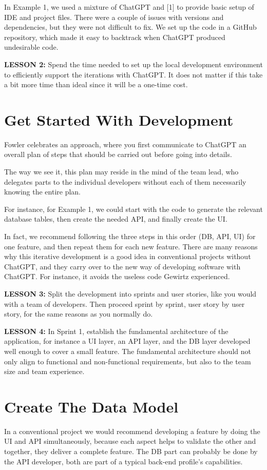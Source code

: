 \documentclass[runningheads]{llncs}
\begin{document}
In Example 1, we used a mixture of ChatGPT and [1] to provide basic setup of IDE and project files. There were a couple of issues with versions and dependencies, but they were not difficult to fix. We set up the code in a GitHub repository, which made it easy to backtrack when ChatGPT produced undesirable code.

\textbf{LESSON 2:} Spend the time needed to set up the local development environment to efficiently support the iterations with ChatGPT. It does not matter if this take a bit more time than ideal since it will be a one-time cost.

\section{Get Started With Development}
Fowler\cite{Fowler2023} celebrates an approach, where you first communicate to ChatGPT an overall plan of steps that should be carried out before going into details.

The way we see it, this plan may reside in the mind of the team lead, who delegates parts to the individual developers without each of them necessarily knowing the entire plan.

For instance, for Example 1, we could start with the code to generate the relevant database tables, then create the needed API, and finally create the UI.

In fact, we recommend following the three steps in this order (DB, API, UI) for one feature, and then repeat them for each new feature. There are many reasons why this iterative development is a good idea in conventional projects without ChatGPT, and they carry over to the new way of developing software with ChatGPT. For instance, it avoids the useless code Gewirtz\cite{Gewirtz2023a} experienced.

\textbf{LESSON 3:} Split the development into sprints and user stories, like you would with a team of developers. Then
proceed sprint by sprint, user story by user story, for the same reasons as you normally do.

\textbf{LESSON 4:} In Sprint 1, establish the fundamental architecture of the application, for instance a UI layer, an API layer, and the DB layer developed well enough to cover a small feature. The fundamental architecture should not only align to functional and non-functional requirements, but also to the team size and team experience.

\section{Create The Data Model}
In a conventional project we would recommend developing a feature by doing the UI and API simultaneously, because each aspect helps to validate the other and together, they deliver a complete feature. The DB part can probably be done by the API developer, both are part of a typical back-end profile's capabilities.
\end{document}
